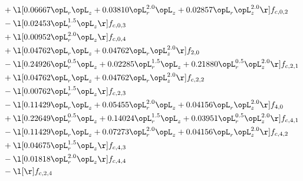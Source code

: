 \begin{alignat}{2}
& + \l[  0.06667 \opL_r \opL_z +  0.03810 \opL_r^{2.0} \opL_z +  0.02857 \opL_r \opL_z^{2.0}  \r] f_{c,0,2} \nonumber \\ 
& - \l[  0.02453 \opL_r^{1.5} \opL_z  \r] f_{c,0,3} \nonumber \\ 
& + \l[  0.00952 \opL_r^{2.0} \opL_z  \r] f_{c,0,4} \nonumber \\ 
& + \l[  0.04762 \opL_r \opL_z +  0.04762 \opL_r \opL_z^{2.0}  \r] f_{2,0} \nonumber \\ 
& - \l[  0.24926 \opL_r^{0.5} \opL_z +  0.02285 \opL_r^{1.5} \opL_z +  0.21880 \opL_r^{0.5} \opL_z^{2.0}  \r] f_{c,2,1} \nonumber \\ 
& + \l[  0.04762 \opL_r \opL_z +  0.04762 \opL_r \opL_z^{2.0}  \r] f_{c,2,2} \nonumber \\ 
& - \l[  0.00762 \opL_r^{1.5} \opL_z  \r] f_{c,2,3} \nonumber \\ 
& - \l[  0.11429 \opL_r \opL_z +  0.05455 \opL_r^{2.0} \opL_z +  0.04156 \opL_r \opL_z^{2.0}  \r] f_{4,0} \nonumber \\ 
& + \l[  0.22649 \opL_r^{0.5} \opL_z +  0.14024 \opL_r^{1.5} \opL_z +  0.03951 \opL_r^{0.5} \opL_z^{2.0}  \r] f_{c,4,1} \nonumber \\ 
& - \l[  0.11429 \opL_r \opL_z +  0.07273 \opL_r^{2.0} \opL_z +  0.04156 \opL_r \opL_z^{2.0}  \r] f_{c,4,2} \nonumber \\ 
& + \l[  0.04675 \opL_r^{1.5} \opL_z  \r] f_{c,4,3} \nonumber \\ 
& - \l[  0.01818 \opL_r^{2.0} \opL_z  \r] f_{c,4,4} \nonumber \\ 
& - \l[  \r] f_{c,2,4} \nonumber \\ 
\end{alignat} 


